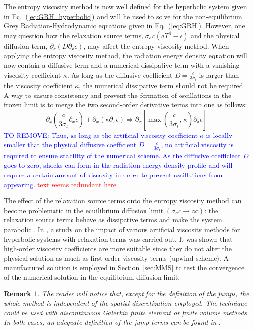 \documentclass[review]{elsarticle}
\newtheorem{remark}{Remark}[section]
\newcommand{\eqt}[1]{Eq.~(\ref{#1})}                     %
\newcommand{\sect}[1]{Section~\ref{#1}}                     %
\newcommand{\tcr}[1]{\textcolor{red}{#1}}
\newcommand{\tcb}[1]{\textcolor{blue}{#1}}
\begin{document}
The entropy viscosity method is now well defined for the hyperbolic system given in \eqt{eq:GRH_hyperbolic} and will be used to solve for the non-equilibrium Grey Radiation-Hydrodynamic equations given in \eqt{eq:GRH}. However, one may question how the relaxation source terms, $\sigma_a c (a T^4-\epsilon)$ and the physical diffusion term, $\partial_x(D\partial_x \epsilon)$, may affect the entropy viscosity method. When applying the entropy viscosity method, the radiation energy density equation will now contain a diffusive term and a numerical dissipative term with a vanishing viscosity coefficient $\kappa$. As long as the diffusive coefficient $D=\frac{c}{3 \sigma_t}$ is larger than the viscosity coefficient $\kappa$, the numerical dissipative term should not be required. A way to ensure consistency and prevent the formation of oscillations in the frozen limit is to merge the two second-order derivative terms into one as follows:
\begin{equation}
 \partial_x \left( \frac{c}{3 \sigma_t} \partial_x \epsilon \right) + \partial_x \left( \kappa \partial_x \epsilon \right) 
 \Longrightarrow
 \partial_x \left[ \max\left(\frac{c}{3 \sigma_t} \text{, } \kappa \right) \partial_x \epsilon \right]
\end{equation}
\tcb{TO REMOVE: Thus, as long as the artificial viscosity coefficient $\kappa$ is locally smaller that the physical diffusive coefficient $D=\frac{c}{3 \sigma_t}$, no artificial viscosity is required to ensure stability of the numerical scheme. As the diffusive coefficient $D$ goes to zero, shocks can form in the radiation energy density profile and will require a certain amount of viscosity in order to prevent oscillations from appearing.}
\tcr{text seems redundant here}

The effect of the relaxation source terms onto the entropy viscosity method can become problematic in the equilibrium diffusion limit $(\sigma_a c \to \infty)$: the relaxation source terms behave as dissipative terms and make the system parabolic \cite{Leveque}. In \cite{ShiJin}, a study on the impact of various artificial viscosity methods for hyperbolic systems with relaxation terms was carried out. It was shown that high-order viscosity coefficients are more suitable since they do not alter the physical solution as much as first-order viscosity terms (upwind scheme). A manufactured  solution is employed in \sect{sec:MMS} to test the convergence of the numerical solution in the equilibrium-diffusion limit.  
%
 \begin{remark}
The reader will notice that, except for the definition of the jumps, the whole method is independent of the spatial discretization employed. The technique could be used with discontinuous Galerkin finite element or finite volume methods. In both cases, an adequate  definition of the jump terms can be found in \cite{valentin}.
 \end{remark}
%
\end{document}
